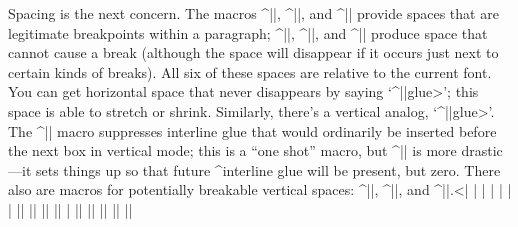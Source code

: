 {{Spacing is the next concern. The macros ^|\enskip|, ^|\quad|, and ^|\qquad|
provide spaces that are legitimate breakpoints within a paragraph;
^|\enspace|, ^|\thinspace|, and ^|\negthinspace| produce space that cannot
cause a break (although the space will disappear if it occurs just
next to certain kinds of breaks). All six of these spaces are relative
to the current font. You can get horizontal space that
never disappears by saying `^|\hglue|\<glue>'; this space is able to
stretch or shrink. Similarly, there's a vertical analog,
`^|\vglue|\<glue>'.
The ^|\nointerlineskip| macro suppresses interline glue that would
ordinarily be inserted before the next box in vertical mode; this is a
``one shot'' macro, but ^|\offinterlineskip| is more drastic---it sets
things up so that future ^{interline glue} will be present, but zero.
There also are macros for potentially breakable vertical spaces:
^|\smallskip|, ^|\medskip|, and ^|\bigskip|.^^|\topglue|
\beginlines
|\def\enskip{\hskip.5em\relax}    \def\enspace{\kern.5em }|
|\def\quad{\hskip1em\relax}       \def\qquad{\hskip2em\relax}|
|\def\thinspace{\kern .16667em }  \def\negthinspace{\kern-.16667em }|
\smallbreak
|\def\hglue{|^|\afterassignment||\hgl@\skip@=}|
|\def\hgl@{\leavevmode \count@=\spacefactor \vrule width0pt|
|  \nobreak\hskip\skip@ \spacefactor=\count@}|
|\def\vglue{\afterassignment\vgl@\skip@=}|
|\def\vgl@{\par \dimen@=\prevdepth \hrule height0pt|
|  \nobreak\vskip\skip@ \prevdepth=\dimen@}|
|\def\topglue{\nointerlineskip \vglue-\topskip \vglue} %
\smallbreak
|\def\nointerlineskip{\prevdepth=-1000pt }|
|\def\offinterlineskip{\baselineskip=-1000pt|
|  \lineskip=0pt \lineskiplimit=\maxdimen}|
\smallbreak
|\def\smallskip{\vskip\smallskipamount}|
|\def\medskip{\vskip\medskipamount}|
|\def\bigskip{\vskip\bigskipamount}|
\endlines

}}
